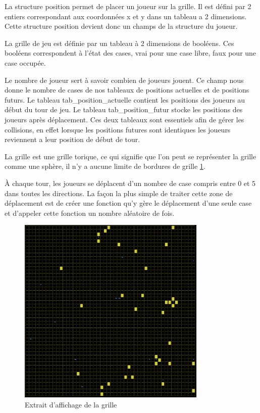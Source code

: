 \documentclass[10pt,a4paper]{article}
\begin{document}
La structure position permet de placer un joueur sur la grille. 
Il est défini par 2 entiers correspondant aux coordonnées x et y dans un tableau a 2 dimensions. Cette structure position devient donc un champs de la structure du joueur. 

La grille de jeu est définie par un tableau à 2 dimensions de booléens. Ces booléens correspondent à l'état des cases, vrai pour une case libre, faux pour une case occupée. 

Le nombre de joueur sert à savoir combien de joueurs jouent. 
Ce champ nous donne le nombre de cases de nos tableaux de positions actuelles et de positions futurs. 
Le tableau tab\_position\_actuelle contient les positions des joueurs au début du tour de jeu. 
Le tableau tab\_position\_futur stocke les positions des joueurs après déplacement.
Ces deux tableaux sont essentiels afin de gérer les collisions, en effet lorsque les positions futures sont identiques les joueurs reviennent a leur position de début de tour.

La grille est une grille torique, ce qui signifie que l'on peut se représenter la grille comme une sphère, il n'y a aucune limite de bordures de grille \ref{grille}.

À chaque tour, les joueurs se déplacent d'un nombre de case compris entre 0 et 5 dans toutes les directions. 
La façon la plus simple de traiter cette zone de déplacement est de créer une fonction qu'y gère le déplacement d'une seule case et d'appeler cette fonction un nombre aléatoire de fois. 

\begin{figure}[h]
	\centering
    \includegraphics[width=9cm]{grille.png}
    \caption{\label{grille} Extrait d'affichage de la grille}
\end{figure}
\end{document}
